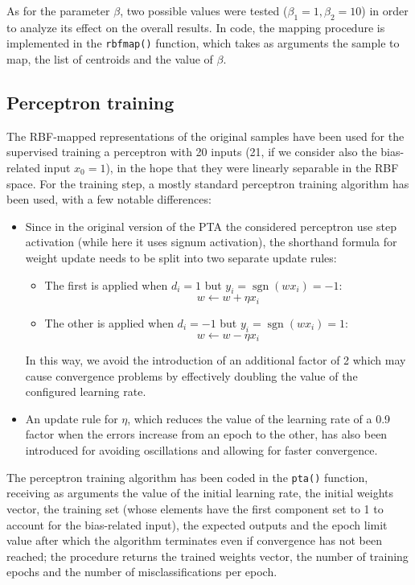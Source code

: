 \documentclass[letterpaper,headings=standardclasses]{scrartcl}
\DeclareMathOperator{\sgn}{sgn}
\begin{document}
As for the parameter $\beta$, two possible values were tested ($\beta_1 = 1, \beta_2 = 10$) in order to analyze its effect on the overall results. In code, the mapping procedure is implemented in the \texttt{rbfmap()} function, which takes as arguments the sample to map, the list of centroids and the value of $\beta$.

\subsection{Perceptron training}

The RBF-mapped representations of the original samples have been used for the supervised training a perceptron with 20 inputs (21, if we consider also the bias-related input $x_0 = 1$), in the hope that they were linearly separable in the RBF space. For the training step, a mostly standard perceptron training algorithm has been used, with a few notable differences:

\begin{itemize}
    \item Since in the original version of the PTA the considered perceptron use step activation (while here it uses signum activation), the shorthand formula for weight update needs to be split into two separate update rules:
    \begin{itemize}
        \item The first is applied when $d_i = 1$ but $y_i = \sgn{(wx_i)} = -1$:
        $$ w \gets w + \eta x_i $$ 
        \item The other is applied when $d_i = -1$ but $y_i = \sgn{(wx_i)} = 1$:
        $$ w \gets w - \eta x_i $$
    \end{itemize}
    In this way, we avoid the introduction of an additional factor of 2 which may cause convergence problems by effectively doubling the value of the configured learning rate.

    \item An update rule for $\eta$, which reduces the value of the learning rate of a 0.9 factor when the errors increase from an epoch to the other, has also been introduced for avoiding oscillations and allowing for faster convergence.
\end{itemize}

The perceptron training algorithm has been coded in the \texttt{pta()} function, receiving as arguments the value of the initial learning rate, the initial weights vector, the training set (whose elements have the first component set to 1 to account for the bias-related input), the expected outputs and the epoch limit value after which the algorithm terminates even if convergence has not been reached; the procedure returns the trained weights vector, the number of training epochs and the number of misclassifications per epoch.
\end{document}

